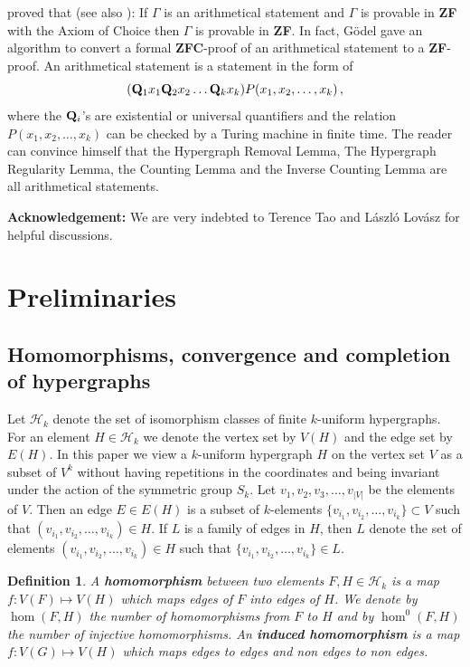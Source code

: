 \documentclass [11pt] {article}
\newtheorem{definition}{Definition}[section]
\def\beQ{{\bf Q}}
\begin{document}
proved that (see also \cite{Chang}): If $\Gamma$ is an 
arithmetical statement and
$\Gamma$ is provable in {\bf ZF} with the
Axiom of Choice then $\Gamma$ is provable in {\bf ZF}.
 In fact, G\"odel
gave an algorithm to convert a formal {\bf ZFC}-proof of
 an arithmetical statement to a
{\bf ZF}-proof. An arithmetical statement is a statement in the form of
$$(\beQ_1 x_1 \beQ_2 x_2 \dots \beQ_k x_k) P(x_1,x_2,\dots,x_k)\,,$$
where the $\beQ_i$'s are existential or universal quantifiers and the
relation $P(x_1,x_2,\dots,x_k)$ can be checked by a Turing machine in finite
time.
The reader can convince himself that the Hypergraph Removal Lemma, The
Hypergraph Regularity Lemma, the Counting Lemma and the Inverse Counting Lemma
are all arithmetical statements. 




\vskip0.2in
\noindent
{\bf Acknowledgement:} We are very indebted to
Terence Tao and L\'aszl\'o Lov\'asz for
helpful discussions.
\section{Preliminaries}\label{prelim}

\subsection{Homomorphisms, convergence and completion of hypergraphs}

\label{homconcomp}
Let $\mathcal{H}_k$ denote the set of isomorphism classes of
 finite $k$-uniform hypergraphs. For an element $H\in\mathcal{H}_k$
we denote the vertex set by $V(H)$ and the edge set by $E(H)$.
In this paper we view a $k$-uniform hypergraph $H$ on the vertex set $V$
as a subset of $V^k$ without having
repetitions in the coordinates and being invariant under the action of the
symmetric group $S_k$. Let $v_1,v_2,v_3,\dots,v_{|V|}$ be the elements
of $V$. Then an edge $E\in E(H)$ is a subset of $k$-elements
$\{v_{i_1}, v_{i_2},\dots,
v_{i_k}\}\subset V$ such that $(v_{i_1}, v_{i_2},\dots,
v_{i_k})\in H$. If $L$ is a family of edges in $H$, then $\hat{L}$ denote the
set of elements $(v_{i_1}, v_{i_2},\dots,
v_{i_k})\in H$ such that $\{v_{i_1}, v_{i_2},\dots,
v_{i_k}\}\in L$.


\begin{definition}
A {\bf homomorphism} between two elements $F,H\in\mathcal{H}_k$ is a
map $f:V(F)\mapsto V(H)$ which maps edges of $F$ into edges of $H$.
We denote by $\hom(F,H)$ the number of homomorphisms from $F$ to $H$
and by $\hom^0(F,H)$ the number of injective homomorphisms.
An {\bf induced homomorphism} is a map $f:V(G)\mapsto V(H)$ which maps edges to edges and non edges to non edges.
\end{definition}
\end{document}
